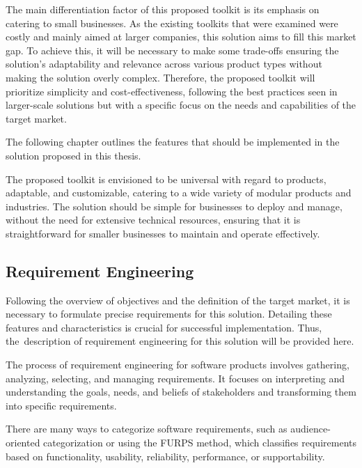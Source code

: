 The main differentiation factor of this proposed toolkit is its emphasis on catering to small businesses. As the existing toolkits that were examined were costly and mainly aimed at larger companies, this solution aims to fill this market gap. To achieve this, it will be necessary to make some trade-offs ensuring the solution's adaptability and relevance across various product types without making the solution overly complex. Therefore, the proposed toolkit will prioritize simplicity and cost-effectiveness, following the best practices seen in larger-scale solutions but with a specific focus on the needs and capabilities of the target market.

The following chapter outlines the features that should be implemented in the solution proposed in this thesis.
 
The proposed toolkit is envisioned to be universal with regard to products, adaptable, and customizable, catering to a wide variety of modular products and industries. The solution should be simple for businesses to deploy and manage, without the need for extensive technical resources, ensuring that it is straightforward for smaller businesses to maintain and operate effectively.

\subsection{Requirement Engineering} \label{section:requirements}

Following the overview of objectives and the definition of the target market, it is necessary to formulate precise requirements for this solution. Detailing these features and characteristics is crucial for successful implementation. Thus, the~description of requirement engineering for this solution will be provided here.

The process of requirement engineering for software products involves gathering, analyzing, selecting, and managing requirements. It focuses on interpreting and understanding the goals, needs, and beliefs of stakeholders and transforming them into specific requirements.~\cite{Aurum2005}

There are many ways to categorize software requirements, such as audience-oriented categorization or using the FURPS method, which classifies requirements based on functionality, usability, reliability, performance, or supportability.~\cite{Stephens2023}

